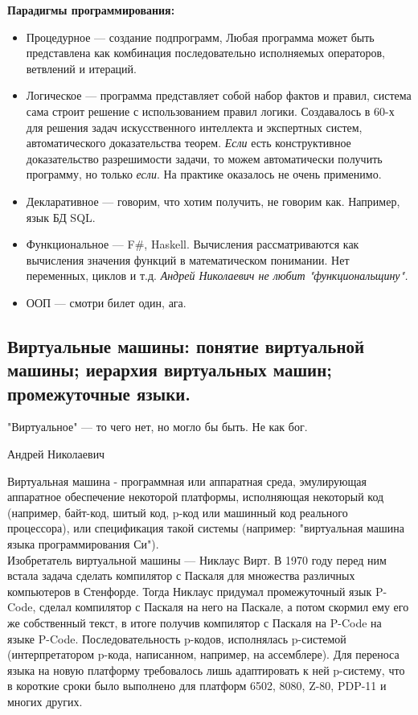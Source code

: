 \documentclass[12pt, a4paper]{article}
\begin{document}
\textbf{Парадигмы программирования:}

\begin{itemize}
    \item Процедурное --- создание подпрограмм, Любая программа может быть представлена как комбинация последовательно исполняемых операторов,  ветвлений и итераций.
    \item Логическое --- программа представляет собой набор фактов и правил, система сама строит решение с использованием правил логики. Создавалось в 60-х для решения задач искусственного интеллекта и экспертных систем, автоматического доказательства теорем. \textit{Если} есть конструктивное доказательство разрешимости задачи, то можем автоматически получить программу, но только \textit{если}. На практике оказалось не очень применимо.
    \item Декларативное --- говорим, что хотим получить, не говорим как. Например, язык БД SQL.
    \item Функциональное --- F\#, Haskell. Вычисления рассматриваются как вычисления значения функций в математическом понимании. Нет переменных, циклов и т.д. \textit{Андрей Николаевич не любит "функциональщину"{}.}
    \item ООП --- смотри билет один, ага.
\end{itemize}

\subsection{Виртуальные машины: понятие виртуальной машины; иерархия виртуальных машин; промежуточные языки.}

\epigraph{"Виртуальное"{} --- то чего нет, но могло бы быть. Не как бог.}{Андрей Николаевич}

Виртуальная машина - программная или аппаратная среда, эмулирующая аппаратное обеспечение некоторой платформы, исполняющая некоторый код (например, байт-код, шитый код, p-код или машинный код реального процессора), или спецификация такой системы (например: "виртуальная машина языка программирования Си"{}).\\

Изобретатель виртуальной машины --- Никлаус Вирт. В 1970 году перед ним встала задача сделать компилятор с Паскаля для множества различных компьютеров в Стенфорде. Тогда Никлаус придумал промежуточный язык P-Code, сделал компилятор с Паскаля на него на Паскале, а потом скормил ему его же собственный текст, в итоге получив компилятор с Паскаля на P-Code на языке P-Code. Последовательность p-кодов, исполнялась p-системой (интерпретатором p-кода, написанном, например, на ассемблере). Для переноса языка на новую платформу требовалось лишь адаптировать к ней p-систему, что в короткие сроки было выполнено для платформ 6502, 8080, Z-80, PDP-11 и многих других.\\
\end{document}
